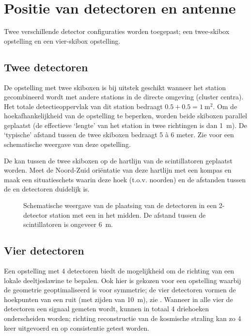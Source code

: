 \section{Positie van detectoren en \gps antenne}

Twee verschillende \hisparc detector configuraties worden toegepast; een
twee-skibox opstelling en een vier-skibox opstelling.


\subsection{Twee detectoren}

De opstelling met twee skiboxen is bij uitstek geschikt wanneer het
station gecombineerd wordt met andere stations in de directe omgeving
(cluster centra). Het totale detectieoppervlak van dit station bedraagt
$0.5 + 0.5 = \SI{1}{\square\meter}$. Om de hoekafhankelijkheid van de
opstelling te beperken, worden beide skiboxen parallel geplaatst (de
effectieve ‘lengte’ van het station in twee richtingen is dan
\SI{1}{\meter}). De ‘typische’ afstand tussen de twee skiboxen bedraagt
5 à 6 meter. Zie  voor een schematische
weergave van deze opstelling.

De \gps kan tussen de twee skiboxen op de hartlijn van de scintillatoren
geplaatst worden. Meet de Noord-Zuid oriëntatie van deze hartlijn met
een kompas en maak een situatieschets waarin deze hoek (t.o.v. noorden)
en de afstanden tussen de \gps en detectoren duidelijk is.

\begin{figure}
    \centering
    
    \caption{Schematische weergave van de plaatsing van de detectoren in een
             2-detector station met een \gps in het midden. De afstand
             tussen de scintillatoren is ongeveer \SI{6}{\meter}.}
    \label{fig:station-2-layout}
\end{figure}


\subsection{Vier detectoren}

Een opstelling met 4 detectoren biedt de mogelijkheid om de richting van
een lokale deeltjeslawine te bepalen. Ook hier is gekozen voor een
opstelling waarbij de geometrie geoptimaliseerd is voor symmetrie; de
vier detectoren vormen de hoekpunten van een ruit (met zijden van
\SI{10}{\meter}), zie . Wanneer in alle
vier de detectoren een signaal gemeten wordt, kunnen in totaal 4
driehoeken onderscheiden worden; richting reconstructie van de kosmische
straling kan zo 4 keer uitgevoerd en op consistentie getest worden.

